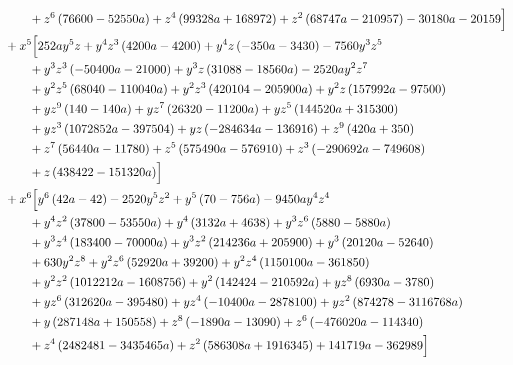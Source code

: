 \begin{align*}
&\qquad + z^{6} \left(76600 - 52550 a\right) + z^{4} \left(99328 a + 168972\right) + z^{2} \left(68747 a - 210957\right) - 30180 a - 20159\Bigr]\\
&{}+x^{5}\Bigl[252 a y^{5} z + y^{4} z^{3} \left(4200 a - 4200\right) + y^{4} z \left(- 350 a - 3430\right) - 7560 y^{3} z^{5}\\
&\qquad + y^{3} z^{3} \left(- 50400 a - 21000\right) + y^{3} z \left(31088 - 18560 a\right) - 2520 a y^{2} z^{7}\\
&\qquad + y^{2} z^{5} \left(68040 - 110040 a\right) + y^{2} z^{3} \left(420104 - 205900 a\right) + y^{2} z \left(157992 a - 97500\right)\\
&\qquad + y z^{9} \left(140 - 140 a\right) + y z^{7} \left(26320 - 11200 a\right) + y z^{5} \left(144520 a + 315300\right)\\
&\qquad + y z^{3} \left(1072852 a - 397504\right) + y z \left(- 284634 a - 136916\right) + z^{9} \left(420 a + 350\right)\\
&\qquad + z^{7} \left(56440 a - 11780\right) + z^{5} \left(575490 a - 576910\right) + z^{3} \left(- 290692 a - 749608\right)\\
&\qquad + z \left(438422 - 151320 a\right)\Bigr]\\
&{}+x^{6}\Bigl[y^{6} \left(42 a - 42\right) - 2520 y^{5} z^{2} + y^{5} \left(70 - 756 a\right) - 9450 a y^{4} z^{4}\\
&\qquad + y^{4} z^{2} \left(37800 - 53550 a\right) + y^{4} \left(3132 a + 4638\right) + y^{3} z^{6} \left(5880 - 5880 a\right)\\
&\qquad + y^{3} z^{4} \left(183400 - 70000 a\right) + y^{3} z^{2} \left(214236 a + 205900\right) + y^{3} \left(20120 a - 52640\right)\\
&\qquad + 630 y^{2} z^{8} + y^{2} z^{6} \left(52920 a + 39200\right) + y^{2} z^{4} \left(1150100 a - 361850\right)\\
&\qquad + y^{2} z^{2} \left(1012212 a - 1608756\right) + y^{2} \left(142424 - 210592 a\right) + y z^{8} \left(6930 a - 3780\right)\\
&\qquad + y z^{6} \left(312620 a - 395480\right) + y z^{4} \left(- 10400 a - 2878100\right) + y z^{2} \left(874278 - 3116768 a\right)\\
&\qquad + y \left(287148 a + 150558\right) + z^{8} \left(- 1890 a - 13090\right) + z^{6} \left(- 476020 a - 114340\right)\\
&\qquad + z^{4} \left(2482481 - 3435465 a\right) + z^{2} \left(586308 a + 1916345\right) + 141719 a - 362989\Bigr]\\

\end{align*}
